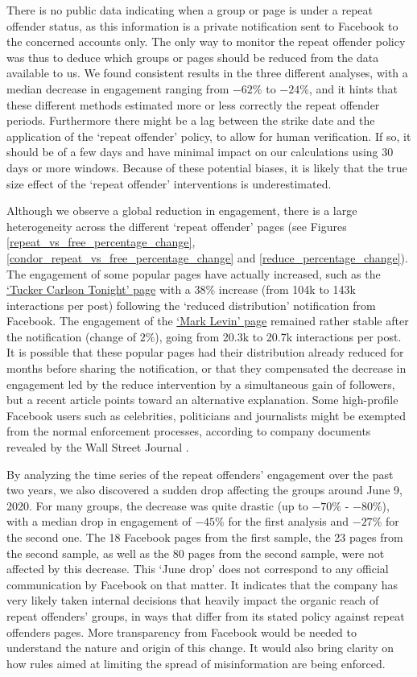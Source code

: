 \documentclass[review]{elsarticle}
\begin{document}
{{There is no public data indicating when a group or page is under a repeat offender status, as this information is a private notification sent to Facebook to the concerned accounts only.
The only way to monitor the repeat offender policy was thus to deduce which groups or pages should be reduced from the data available to us.
We found consistent results in the three different analyses, with a median decrease in engagement ranging from $-62\%$ to $-24\%$, and it hints that these different methods estimated more or less correctly the repeat offender periods.
Furthermore there might be a lag between the strike date and the application of the `repeat offender' policy, to allow for human verification. 
If so, it should be of a few days and have minimal impact on our calculations using 30 days or more windows.
Because of these potential biases, it is likely that the true size effect of the `repeat offender' interventions is underestimated.

Although we observe a global reduction in engagement, there is a large heterogeneity across the different `repeat offender' pages (see Figures \ref{repeat_vs_free_percentage_change}, \ref{condor_repeat_vs_free_percentage_change} and \ref{reduce_percentage_change}). 
The engagement of some popular pages have actually increased, such as the \href{https://www.facebook.com/TuckerCarlsonTonight/}{`Tucker Carlson Tonight' page} with a $38\%$ increase (from 104k to 143k interactions per post) following the `reduced distribution' notification from Facebook.
The engagement of the \href{https://www.facebook.com/marklevinshow}{`Mark Levin' page} remained rather stable after the notification (change of $2\%$), going from 20.3k to 20.7k interactions per post.
It is possible that these popular pages had their distribution already reduced for months before sharing the notification, or that they compensated the decrease in engagement led by the reduce intervention by a simultaneous gain of followers, but a recent article points toward an alternative explanation.
Some high-profile Facebook users such as celebrities, politicians and journalists might be exempted from the normal enforcement processes, according to company documents revealed by the Wall Street Journal \citep{WSJrevelations}.

By analyzing the time series of the repeat offenders’ engagement over the past two years, we also discovered a sudden drop affecting the groups around June 9, 2020.
For many groups, the decrease was quite drastic (up to $-70\%$ - $-80\%$), with a median drop in engagement of $-45\%$ for the first analysis and $-27\%$ for the second one.
The 18 Facebook pages from the first sample, the 23 pages from the second sample, as well as the 80 pages from the second sample, were not affected by this decrease.
This `June drop' does not correspond to any official communication by Facebook on that matter. 
It indicates that the company has very likely taken internal decisions that heavily impact the organic reach of repeat offenders' groups, in ways that differ from its stated policy against repeat offenders pages.
More transparency from Facebook would be needed to understand the nature and origin of this change. 
It would also bring clarity on how rules aimed at limiting the spread of misinformation are being enforced.

}}
\end{document}
